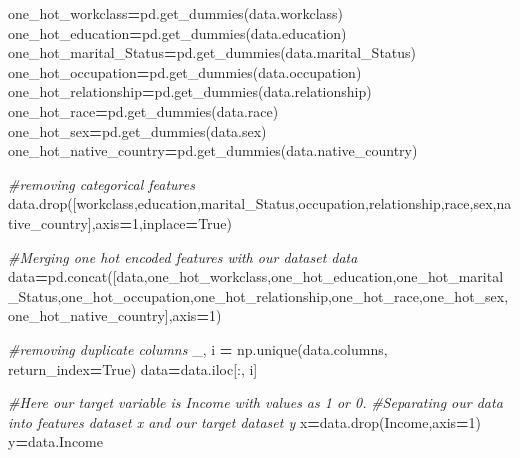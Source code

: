 \documentclass[
]{book}
\newenvironment{Shaded}{\begin{snugshade}}{\end{snugshade}}
\newcommand{\CommentTok}[1]{\textcolor[rgb]{0.56,0.35,0.01}{\textit{#1}}}
\newcommand{\DecValTok}[1]{\textcolor[rgb]{0.00,0.00,0.81}{#1}}
\newcommand{\NormalTok}[1]{#1}
\newcommand{\OperatorTok}[1]{\textcolor[rgb]{0.81,0.36,0.00}{\textbf{#1}}}
\newcommand{\StringTok}[1]{\textcolor[rgb]{0.31,0.60,0.02}{#1}}
\newcommand{\VariableTok}[1]{\textcolor[rgb]{0.00,0.00,0.00}{#1}}
\begin{document}
\begin{Shaded}
\begin{Highlighting}[]
\NormalTok{one\_hot\_workclass}\OperatorTok{=}\NormalTok{pd.get\_dummies(data.workclass) }
\NormalTok{one\_hot\_education}\OperatorTok{=}\NormalTok{pd.get\_dummies(data.education) }
\NormalTok{one\_hot\_marital\_Status}\OperatorTok{=}\NormalTok{pd.get\_dummies(data.marital\_Status) }
\NormalTok{one\_hot\_occupation}\OperatorTok{=}\NormalTok{pd.get\_dummies(data.occupation)}
\NormalTok{one\_hot\_relationship}\OperatorTok{=}\NormalTok{pd.get\_dummies(data.relationship) }
\NormalTok{one\_hot\_race}\OperatorTok{=}\NormalTok{pd.get\_dummies(data.race) }
\NormalTok{one\_hot\_sex}\OperatorTok{=}\NormalTok{pd.get\_dummies(data.sex) }
\NormalTok{one\_hot\_native\_country}\OperatorTok{=}\NormalTok{pd.get\_dummies(data.native\_country) }

\CommentTok{\#removing categorical features }
\NormalTok{data.drop([}\StringTok{\textquotesingle{}workclass\textquotesingle{}}\NormalTok{,}\StringTok{\textquotesingle{}education\textquotesingle{}}\NormalTok{,}\StringTok{\textquotesingle{}marital\_Status\textquotesingle{}}\NormalTok{,}\StringTok{\textquotesingle{}occupation\textquotesingle{}}\NormalTok{,}\StringTok{\textquotesingle{}relationship\textquotesingle{}}\NormalTok{,}\StringTok{\textquotesingle{}race\textquotesingle{}}\NormalTok{,}\StringTok{\textquotesingle{}sex\textquotesingle{}}\NormalTok{,}\StringTok{\textquotesingle{}native\_country\textquotesingle{}}\NormalTok{],axis}\OperatorTok{=}\DecValTok{1}\NormalTok{,inplace}\OperatorTok{=}\VariableTok{True}\NormalTok{) }

 

\CommentTok{\#Merging one hot encoded features with our dataset \textquotesingle{}data\textquotesingle{} }
\NormalTok{data}\OperatorTok{=}\NormalTok{pd.concat([data,one\_hot\_workclass,one\_hot\_education,one\_hot\_marital\_Status,one\_hot\_occupation,one\_hot\_relationship,one\_hot\_race,one\_hot\_sex,one\_hot\_native\_country],axis}\OperatorTok{=}\DecValTok{1}\NormalTok{) }

\CommentTok{\#removing duplicate columns }
\NormalTok{\_, i }\OperatorTok{=}\NormalTok{ np.unique(data.columns, return\_index}\OperatorTok{=}\VariableTok{True}\NormalTok{) }
\NormalTok{data}\OperatorTok{=}\NormalTok{data.iloc[:, i] }

\CommentTok{\#Here our target variable is \textquotesingle{}Income\textquotesingle{} with values as 1 or 0.  }
\CommentTok{\#Separating our data into features dataset x and our target dataset y }
\NormalTok{x}\OperatorTok{=}\NormalTok{data.drop(}\StringTok{\textquotesingle{}Income\textquotesingle{}}\NormalTok{,axis}\OperatorTok{=}\DecValTok{1}\NormalTok{) }
\NormalTok{y}\OperatorTok{=}\NormalTok{data.Income }


\end{Highlighting}
\end{Shaded}
\end{document}
